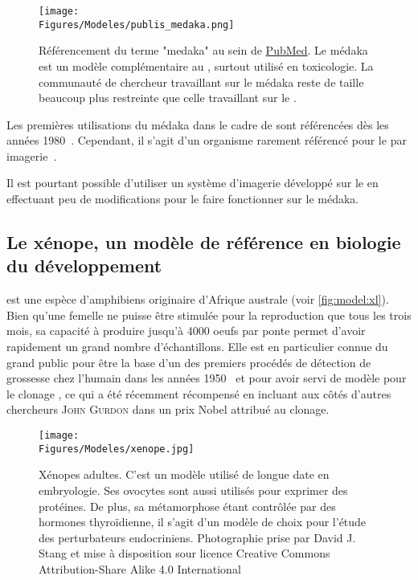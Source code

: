 \documentclass[\main/main.tex]{subfiles}
\begin{document}
\begin{figure}[h!]{\textwidth} 
    \centering
       \centering \texttt{[image: \\Figures/Modeles/publis\_medaka.png]}
       \caption{
            \label{fig:model:oz:stats}Référencement du terme "medaka" au sein de \href{https://pubmed.ncbi.nlm.nih.gov/?term=medaka&sort=pubdate}{PubMed}.\newline
            Le médaka est un modèle complémentaire au \pz{}, surtout utilisé en toxicologie. La communauté de chercheur travaillant sur le médaka reste de taille beaucoup plus restreinte que celle travaillant sur le \pz{}.
            }
\end{figure}

Les premières utilisations du médaka dans le cadre de \hcs{} sont référencées dès les années 1980~\cite{cameron_1985,Hatanaka_1982}.
%
Cependant, il s'agit d'un organisme rarement référencé pour le \hcs{} par imagerie~\cite{gierten_2020,genest_2019}.

%
Il est pourtant possible d'utiliser un système d'imagerie développé sur le \pz{}
en effectuant peu de modifications pour le faire fonctionner sur le médaka.

    \subsection{Le xénope, un modèle de référence en biologie du développement}

%
\xl{} est une espèce d'amphibiens originaire d'Afrique australe (voir \autoref{fig:model:xl}).
Bien qu'une femelle ne puisse être stimulée pour la reproduction que tous les trois mois,
sa capacité à produire jusqu'à 4000 oeufs par ponte permet d'avoir rapidement un grand nombre d'échantillons.
%
Elle est en particulier connue du grand public pour être la base d'un des premiers procédés de détection de grossesse chez l'humain dans les années 1950~\cite{hobson_1958,Dittebrandt_1949,polack_1949}
et pour avoir servi de modèle pour le clonage , ce qui a été récemment récompensé en incluant aux côtés d'autres chercheurs \textsc{John Gurdon}  dans un prix Nobel attribué au clonage.

\begin{figure}[h!]{\textwidth} 
    \centering
       \centering \texttt{[image: \\Figures/Modeles/xenope.jpg]}
       \caption{
            \label{fig:model:xl}
            Xénopes adultes.
            \newline
            C'est un modèle utilisé de longue date en embryologie.
            Ses ovocytes sont aussi utilisés pour exprimer des protéines.
            De plus, sa métamorphose étant contrôlée par des hormones thyroïdienne, il s'agit d'un modèle de choix pour l'étude des perturbateurs endocriniens.
            \newline
            Photographie prise par David J. Stang et mise à disposition sour licence  Creative Commons Attribution-Share Alike 4.0 International
            }
\end{figure}
\end{document}

